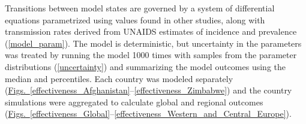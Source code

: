 \documentclass{article}
\begin{document}
Transitions between model states are governed by a system of
differential equations parametrized using values found in other
studies, along with transmission rates derived from UNAIDS estimates
of incidence and prevalence (\autoref{model_param}).  The model is
deterministic, but uncertainty in the parameters was treated by
running the model 1000 times with samples from the parameter
distributions (\autoref{uncertainty}) and summarizing the model
outcomes using the median and percentiles.  Each country was modeled
separately
(\hyperref[effectiveness_Afghanistan]{Figs.~\ref*{effectiveness_Afghanistan}}--\ref{effectiveness_Zimbabwe})
and the country simulations were aggregated to calculate global and
regional outcomes
(\hyperref[effectiveness_Global]{Figs.~\ref*{effectiveness_Global}}--\ref*{effectiveness_Western_and_Central_Europe}).
\end{document}
